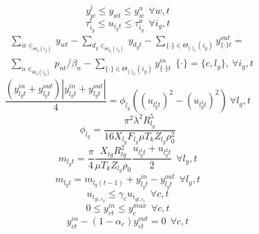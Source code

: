 \documentclass[journal]{IEEEtran}
\begin{document}
\begin{equation}\label{gas_output}
  y_w^l \le y_{wt} \le y_w^u~~\forall w,t
\end{equation}
\begin{equation}\label{node_pressure}
\tau_{i_g}^l\le u_{i_gt} \le \tau_{i_g}^u~~\forall i_g,t
\end{equation}
\begin{equation}
\begin{split}
\label{gas_balance}
&\sum_{w\in_{\Theta_w(i_g)}}y_{wt}-\sum_{d_g\in_{\Theta_{d_g}(i_g)}}y_{d_gt}-\sum_{\{\cdot\}\in\Theta_{\{\cdot\}_{1}}(i_g)}y^{out}_{\{\cdot\}t}=\\
&\sum_{n\in_{\Theta_n(i_g)}}p_{nt}/\beta_n-\sum_{\{\cdot\}\in\Theta_{\{\cdot\}_{2}}(i_g)}y^{in}_{\{\cdot\}t}~~\{\cdot\}=\{c,l_g\},~\forall i_g,t
\end{split}
\end{equation}
\begin{equation}\label{weymouth}
\frac{(y_{l_gt}^{in}+y_{l_gt}^{out})|y_{l_gt}^{in}+y_{l_gt}^{out}|}{4}=\phi_{l_g}((u_{l_g^1t})^2-(u_{l_g^2t})^2)~\forall l_g,t
\end{equation}
\begin{equation}\label{wey_co}
\phi_{l_g}=\frac{\pi^2\lambda^2R_{l_g}^5}{16X_{l_g}F_{l_g}\mu T_kZ_{l_g}\rho_0^2}
\end{equation}
\begin{equation}\label{gas_mass}
m_{l_gt}=\frac{\pi}{4}\frac{X_{lg}R_{lg}^2}{\mu T_kZ_{l_g}\rho_0}\frac{u_{l_g^1t}+u_{l_g^2t}}{2}~~\forall l_g,t
\end{equation}
\begin{equation}\label{gas_mass_storage}
m_{l_gt}=m_{l_g(t-1)}+y^{in}_{l_gt}-y^{out}_{l_gt}~~\forall l_g,t
\end{equation}
\begin{equation}\label{com_pressure}
  u_{i_{gt,c_2}}\le \gamma_cu_{i_{gt,c_1}}~~\forall c,t
\end{equation}
\begin{equation}\label{com_flow_in}
  0\le y_{ct}^{in} \le y_c^{max}~~\forall c,t
\end{equation}
\begin{equation}\label{com_flow_out_1}
  y_{ct}^{in}-(1-\alpha_c)y_{ct}^{out}=0~~\forall c,t
\end{equation}
\end{document}
